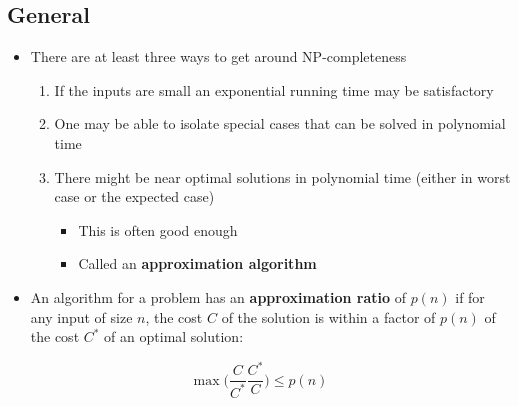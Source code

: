 \documentclass[11pt]{article}
\begin{document}
\subsection{General}
\label{sec:org6d68b15}
\begin{itemize}
\item There are at least three ways to get around NP-completeness
\begin{enumerate}
\item If the inputs are small an exponential running time may be satisfactory
\item One may be able to isolate special cases that can be solved in polynomial time
\item There might be near optimal solutions in polynomial time (either in worst case or the expected case)
\begin{itemize}
\item This is often good enough
\item Called an \textbf{approximation algorithm}
\end{itemize}
\end{enumerate}

\item An algorithm for a problem has an \textbf{approximation ratio} of \(p(n)\) if for any input of size \(n\), the cost \(C\) of the solution is within a factor of \(p(n)\) of the cost \(C^*\) of an optimal solution:
\end{itemize}
\begin{equation*}
	\max\bigg(\frac C{C^*} \frac{C^*}{C} \bigg) \leq p(n)
\end{equation*}
\end{document}
